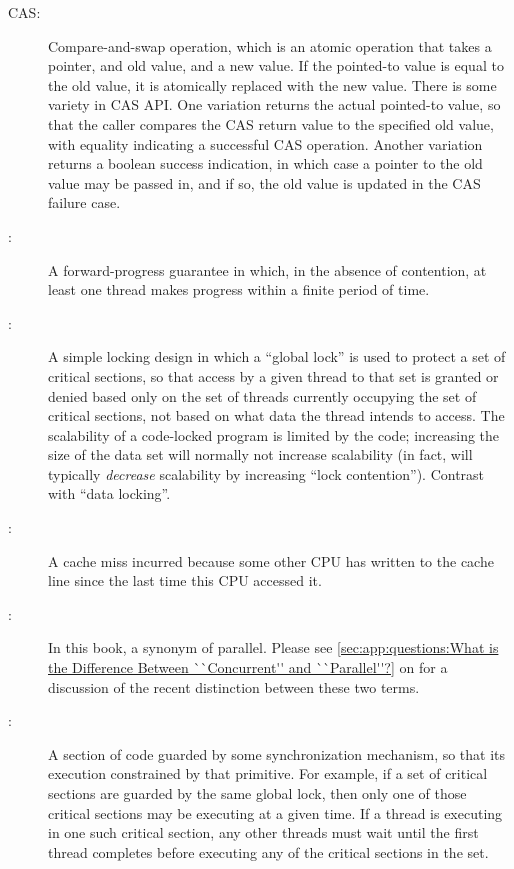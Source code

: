 \begin{description}
\item[CAS:]
	Compare-and-swap operation, which is an atomic operation that
	takes a pointer, and old value, and a new value.
	If the pointed-to value is equal to the old value, it is atomically
	replaced with the new value.
	There is some variety in CAS API.\@
	One variation returns the actual pointed-to value, so that the
	caller compares the CAS return value to the specified old value,
	with equality indicating a successful CAS operation.
	Another variation returns a boolean success indication, in which
	case a pointer to the old value may be passed in, and if so,
	the old value is updated in the CAS failure case.
\item[:]
	A forward-progress guarantee in which, in the absence of
	contention, at least one thread makes progress within a finite
	period of time.
\item[:]
	A simple locking design in which a ``global lock'' is used to protect
	a set of critical sections, so that access by a given thread
	to that set is
	granted or denied based only on the set of threads currently
	occupying the set of critical sections, not based on what
	data the thread intends to access.
	The scalability of a code-locked program is limited by the code;
	increasing the size of the data set will normally not increase
	scalability (in fact, will typically \emph{decrease} scalability
	by increasing ``lock contention'').
	Contrast with ``data locking''.
\item[:]
	A cache miss incurred because some other CPU has written to
	the cache line since the last time this CPU accessed it.
\item[:]
	In this book, a synonym of parallel.
	Please see \cref{sec:app:questions:What is the Difference Between ``Concurrent'' and ``Parallel''?}
	on 
	for a discussion of the recent distinction between these two
	terms.
\item[:]
	A section of code guarded by some synchronization mechanism,
	so that its execution constrained by that primitive.
	For example, if a set of critical sections are guarded by
	the same global lock, then only one of those critical sections
	may be executing at a given time.
	If a thread is executing in one such critical section,
	any other threads must wait until the first thread completes
	before executing any of the critical sections in the set.

\end{description}
